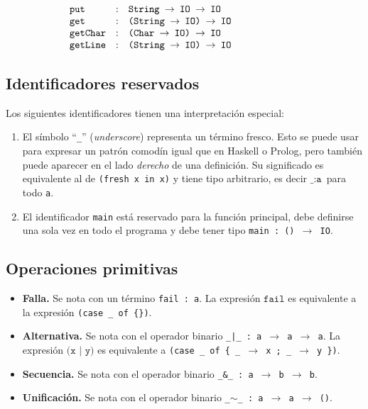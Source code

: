 \begin{enumerate}
$$\begin{array}{l@{\hspace{-2.75cm}}llll}
                         &        & \texttt{put}     & : & \texttt{String $\rightarrow$ IO $\rightarrow$ IO} \\
                         &        & \texttt{get}     & : & \texttt{(String $\rightarrow$ IO) $\rightarrow$ IO} \\
                         &        & \texttt{getChar} & : & \texttt{(Char $\rightarrow$ IO) $\rightarrow$ IO} \\
                         &        & \texttt{getLine} & : & \texttt{(String $\rightarrow$ IO) $\rightarrow$ IO} \\
    \end{array}
    $$
\end{enumerate}

\subsection{Identificadores reservados}

Los siguientes identificadores tienen una interpretación especial:
\begin{enumerate}
  \item El símbolo ``\texttt{\_}'' ({\em underscore}) representa un
        término fresco. Esto se puede usar para expresar un patrón comodín
        igual que en Haskell o Prolog, pero también puede aparecer
        en el lado {\em derecho} de una definición.
        Su significado es equivalente al de \texttt{(fresh x in x)}
        y tiene tipo arbitrario, es decir $\texttt{\_} : \texttt{a}$
        para todo \texttt{a}.
  \item El identificador \texttt{main} está reservado para la función principal,
        debe definirse una sola vez en todo el programa
        y debe tener tipo \texttt{main : () $\rightarrow$ IO}.
\end{enumerate}

\subsection{Operaciones primitivas}

\begin{itemize}
  \item {\bf Falla.}
        Se nota con un término \texttt{fail : a}.
        La expresión $\texttt{fail}$ es equivalente a la expresión \texttt{(case \_ of \{\})}.
  \item {\bf Alternativa.}
        Se nota con el operador binario \texttt{\_|\_ : a $\to$ a $\to$ a}.
        La expresión $\texttt{(x | y)}$
        es equivalente a \texttt{(case \_ of \{ \_ $\to$ x ; \_ $\to$ y \})}.
  \item {\bf Secuencia.}
        Se nota con el operador binario \texttt{\_\&\_ : a $\to$ b $\to$ b}.
  \item {\bf Unificación.}
        Se nota con el operador binario \texttt{\_$\sim$\_ : a $\to$ a $\to$ ()}.
\end{itemize}

